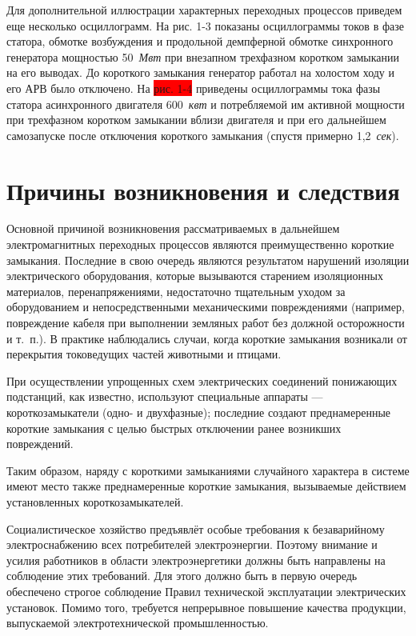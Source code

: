 Для дополнительной иллюстрации характерных переходных процессов приведем еще несколько осциллограмм. На рис. 1-3 показаны осциллограммы токов в фазе статора, обмотке возбуждения и продольной демпферной обмотке синхронного генератора мощностью 50~\textit{Мвт} при внезапном трехфазном коротком замыкании на его выводах. До короткого замыкания генератор работал на холостом ходу и его АРВ было отключено. На \colorbox{red}{рис. 1-4} приведены осциллограммы тока фазы статора асинхронного двигателя 600~\textit{квт} и потребляемой им активной мощности при трехфазном коротком замыкании вблизи двигателя и при его дальнейшем самозапуске после отключения короткого замыкания (спустя примерно 1,2~\textit{сек}).

\section{Причины возникновения и следствия}
\label{sec:1-2 prichiny_vozniknoveniia_i_sledstviia}

Основной причиной возникновения рассматриваемых в дальнейшем электромагнитных переходных процессов являются преимущественно короткие замыкания. Последние в свою очередь являются результатом нарушений изоляции электрического оборудования, которые вызываются старением изоляционных материалов, перенапряжениями, недостаточно тщательным уходом за оборудованием и непосредственными механическими повреждениями (например, повреждение кабеля при выполнении земляных работ без должной осторожности и т.~п.). В практике наблюдались случаи, когда короткие замыкания возникали от перекрытия токоведущих частей животными и птицами.

При осуществлении упрощенных схем электрических соединений понижающих подстанций, как известно, используют специальные аппараты --- короткозамыкатели (одно- и двухфазные); последние создают преднамеренные короткие замыкания с целью быстрых отключении ранее возникших повреждений.

Таким образом, наряду с короткими замыканиями случайного характера в системе имеют место также преднамеренные короткие замыкания, вызываемые действием установленных короткозамыкателей.

Социалистическое хозяйство предъявлёт особые требования к безаварийному электроснабжению всех потребителей электроэнергии. Поэтому внимание и усилия работников в области электроэнергетики должны быть направлены на соблюдение этих требований. Для этого должно быть в первую очередь обеспечено строгое соблюдение Правил технической эксплуатации электрических установок. Помимо того, требуется непрерывное повышение качества продукции, выпускаемой электротехнической промышленностью.

